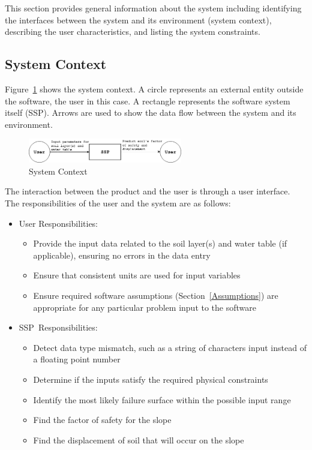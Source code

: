 \documentclass[12pt]{article}
\newcommand{\progname}{SSP}
\begin{document}
This section provides general information about the system including
identifying the interfaces between the system and its environment (system context),
describing the user characteristics, and listing the system constraints.

\subsection{System Context}

Figure~\ref{Fig_SystemContext}
 shows the system context.  A circle represents an
external entity outside the software, the user in this case.  A rectangle
represents the software system itself (\progname).  Arrows are used to show the data
flow between the system and its environment.

\begin{figure}[h!]
	\begin{center}
		\includegraphics[width=0.6\textwidth]{SystemContextFigure.png}
		\caption{System Context}
		\label{Fig_SystemContext} 
	\end{center}
\end{figure}

The interaction between the product and the user is through a user
interface.  The responsibilities of the user and the system are as follows:

\begin{itemize}
\item User Responsibilities:
  \begin{itemize}
  \item Provide the input data related to the soil layer(s) and water table (if applicable),
    ensuring no errors in the data entry
  \item Ensure that consistent units are used for input variables
  \item Ensure required software assumptions (Section~\ref{Assumptions}) are
    appropriate for any particular problem input to the software
  \end{itemize}
\item \progname\ Responsibilities:
  \begin{itemize}
  \item Detect data type mismatch, such as a string of characters input instead
    of a floating point number
  \item Determine if the inputs satisfy the required physical
    constraints
  \item Identify the most likely failure surface within the possible input range
  \item Find the factor of safety for the slope
  \item Find the displacement of soil that will occur on the slope
  \end{itemize}
\end{itemize}
\end{document}
